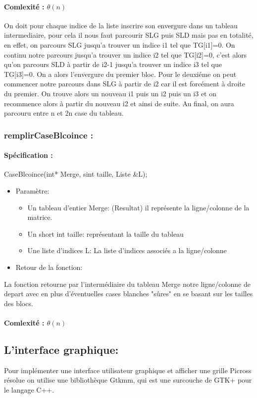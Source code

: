 \documentclass{article}
\begin{document}
\paragraph{Comlexité : $\theta(n)$\newline}
On doit pour chaque indice de la liste inscrire son envergure dans un tableau intermediaire, pour cela il nous faut parcourir SLG puis SLD mais pas en totalité, en effet, on parcours SLG jusqu'a trouver un indice i1 tel que TG[i1]=0.
On continu notre parcours jusqu'a trouver un indice i2 tel que TG[i2]=0, c'est alors qu'on parcours SLD à partir de i2-1 jusqu'a trouver un indice i3 tel que TG[i3]=0. 
On a alors l'envergure du premier bloc. Pour le deuxiéme on peut commencer notre parcours dans SLG à partir de i2 car il est forcément à droite du premier.\newline 
On trouve alors un nouveau i1 puis un i2 puis un i3 et on recommence alors à partir du nouveau i2 et ainsi de suite. Au final, on aura parcouru entre n et 2n case du tableau.
\subsubsection{remplirCaseBlcoince :}
\paragraph{Spécification :}CaseBlcoince(int* Merge, sint taille, Liste \&L);
\begin{itemize}
\item Param\`etre:
\begin{itemize}
\item Un tableau d'entier Merge: (Resultat) il représente la ligne/colonne de la matrice.
\item Un short int taille: représentant la taille du tableau
\item Une liste d'indices L: La liste d'indices associés a la ligne/colonne
\end{itemize}
\item Retour de la fonction:
\end{itemize}
La fonction retourne par l'intermédiaire du tableau Merge notre ligne/colonne de depart avec en plus d'éventuelles cases blanches "sûres" en se basant sur les tailles des blocs.
\paragraph{Comlexité : $\theta(n)$\newline}
\subsection{ L'interface graphique:}
Pour implémenter une interface utilisateur graphique et afficher une grille Picross résolue on utilise une bibliothèque Gtkmm, qui est une surcouche de GTK+ pour le langage C++.
\end{document}
